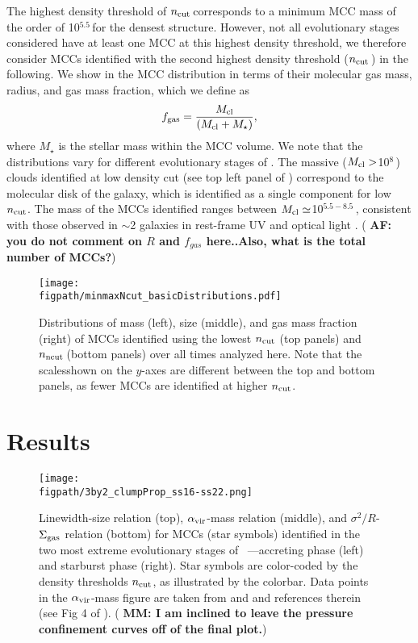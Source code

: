\IfFileExists{emulateapjlegacy.cls}{\documentclass[iop]{emulateapjlegacy}}{\documentclass[iop]{emulateapj}}
\newcommand{\AF}[1]{({\bf \color{afcolor} AF: #1})}
\newcommand{\MM}[1]{({\bf \color{mmcolor} MM: #1})}
\def\figpath{./Fig}
\begin{document}
The highest density threshold of $n_{\rm cut}$\,\cc corresponds to 
a minimum MCC mass of the order of 10$^{5.5}$\,\Msun for the densest structure.
However, not all evolutionary stages considered have at least one MCC at this highest density threshold, 
we therefore consider MCCs identified with the second highest density threshold  ($n_{\rm cut}$\,\cc) in the following. 
We show in  the MCC distribution in terms of their molecular gas mass, radius, and gas mass fraction, which we define as
\begin{equation}
f_{\rm gas} = \frac{M_{\rm cl}} {\left(M_{\rm cl} + M_\star\right)},
\end{equation}
where $M_\star$ is the stellar mass within the MCC volume.
%
We note that the distributions vary for different evolutionary stages of \flower. 
%
The massive ($M_{\rm cl}>$10$^8$\,\Msun) 
clouds identified at low density cut (see top left panel of )  
correspond to the molecular disk of the
galaxy, which is identified as a single component for low $n_{\rm
  cut}$. The mass of the MCCs identified ranges between $M_{\rm
  cl}\simeq$10$^{5.5-8.5}$\,\Msun, consistent with those observed in
\z$\sim$2 galaxies in rest-frame UV and optical light
\citep{Elmegreen07a, Elmegreen09a}. \AF{you do not comment on $R$ and
  $f_{gas}$ here..Also, what is the total number of MCCs?} 

\begin{figure*}[htbp]
\centering
\texttt{[image: \\figpath/minmaxNcut\_basicDistributions.pdf]}
\caption{Distributions of mass (left), size (middle), and gas mass
  fraction (right) of MCCs identified using the lowest $n_{\rm cut}$
  (top panels) and $n_{\rm ncut}$\,\cc (bottom panels)
      over all times analyzed here.
Note that the scalesshown on the $y$-axes are different between the top
and bottom panels, as fewer MCCs are identified at higher $n_{\rm
  cut}$. 
\label{fig:dist}}
\end{figure*}


\section{Results}\label{sec:results}

\begin{figure*}
\centering
\texttt{[image: \\figpath/3by2\_clumpProp\_ss16-ss22.png]}
\caption{
Linewidth-size relation (top), $\alpha_{\rm vir}$-mass relation
(middle), and $\sigma^2/R$-$\Sigma_{\rm gas}$ relation (bottom) for
MCCs (star symbols) identified in the two most extreme evolutionary
stages of \flower\ ---accreting phase (left) and starburst phase
(right). Star symbols are color-coded by the density thresholds
$n_{\rm cut}$, as illustrated by the colorbar.
Data points in the $\alpha_{\rm vir}$-mass figure are taken from
\citet{Kauffmann17a} and \citet{Kauffmann17b} and references therein
(see Fig 4 of \citealt{Kauffmann17b}).   \MM{I
  am inclined to leave the pressure confinement curves off of the
  final plot.}
\label{fig:larsons_single}}
\end{figure*}
\end{document}
